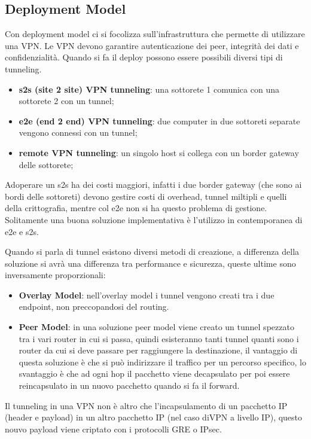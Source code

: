 \documentclass[12pt]{article}
\begin{document}
\subsection{Deployment Model}
Con deployment model ci si focolizza sull'infrastruttura che permette di utilizzare una VPN. Le VPN devono garantire autenticazione dei peer, integrit\`a dei dati e confidenzialit\`a. Quando si fa il deploy possono essere possibili diversi tipi di tunneling.
\begin{itemize}
    \item \textbf{s2s (site 2 site) VPN tunneling}: una sottorete 1 comunica con una sottorete 2 con un tunnel;
    \item \textbf{e2e (end 2 end) VPN tunneling}: due computer in due sottoreti separate vengono connessi con un tunnel;
    \item \textbf{remote VPN tunneling}: un singolo host si collega con un border gateway delle sottorete;
\end{itemize}
Adoperare un s2s ha dei costi maggiori, infatti i due border gateway (che sono ai bordi delle sottoreti) devono gestire costi di overhead, tunnel miltipli e quelli della crittografia, mentre col e2e non si ha questo problema di gestione. Solitamente una buona soluzione implementativa \`e l'utilizzo in contemporanea di e2e e s2s.

Quando si parla di tunnel esistono diversi metodi di creazione, a differenza della soluzione si avr\`a una differenza tra performance e sicurezza, queste ultime sono inversamente proporzionali:
\begin{itemize}
    \item \textbf{Overlay Model}: nell'overlay model i tunnel vengono creati tra i due endpoint, non preccopandosi del routing.
    \item \textbf{Peer Model}: in una soluzione peer model viene creato un tunnel spezzato tra i vari router in cui si passa, quindi esisteranno tanti tunnel quanti sono i router da cui si deve passare per raggiungere la destinazione, il vantaggio di questa soluzione \`e che si pu\`o indirizzare il traffico per un percorso specifico, lo svantaggio \`e che ad ogni hop il pacchetto viene decapsulato per poi essere reincapsulato in un nuovo pacchetto quando si fa il forward.
\end{itemize}


Il tunneling in una VPN non \`e altro che l'incapsulamento di un pacchetto IP (header e payload) in un altro pacchetto IP (nel caso diVPN a livello IP), questo nouvo payload viene criptato con i protocolli GRE o IPsec.
\end{document}
